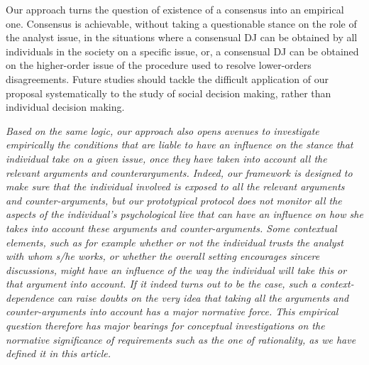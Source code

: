 \documentclass[version=3.21, pagesize, twoside=off, bibliography=totoc, DIV=calc, fontsize=12pt, a4paper, french, english]{scrartcl}
\begin{document}
Our approach turns the question of existence of a consensus into an empirical one. Consensus is achievable, without taking a questionable stance on the role of the analyst issue, in the situations where a consensual \ac{DJ} can be obtained by all individuals in the society on a specific issue, or, a consensual \ac{DJ} can be obtained on the higher-order issue of the procedure used to resolve lower-orders disagreements. Future studies should tackle the difficult application of our proposal systematically to the study of social decision making, rather than individual decision making.

\emph{Based on the same logic, our approach also opens avenues to investigate empirically the conditions that are liable to have an influence on the stance that individual take on a given issue, once they have taken into account all the relevant arguments and counterarguments. Indeed, our framework is designed to make sure that the individual involved is exposed to all the relevant arguments and counter-arguments, but our prototypical protocol does not monitor all the aspects of the individual's psychological live that can have an influence on how she \emph{takes into account} these arguments and counter-arguments. Some contextual elements, such as for example whether or not the individual trusts the analyst with whom s/he works, or whether the overall setting encourages sincere discussions, might have an influence of the way the individual will take this or that argument into account. If it indeed turns out to be the case, such a context-dependence can raise doubts on the very idea that taking all the arguments and counter-arguments into account has a major normative force. This empirical question therefore has major bearings for conceptual investigations on the normative significance of requirements such as the one of rationality, as we have defined it in this article.}

\end{document}
